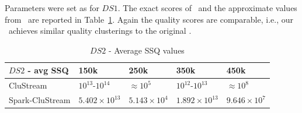 Parameters were set as for $DS1$.
The exact scores of \our~and the approximate values from \clustream~are reported %
in Table~\ref{tab:DS2quality}. Again the quality scores are comparable, i.e., our \our~achieves similar quality clusterings to the original \clustream.

\begin{table}[t]
\centering
\begin{tabular}{|l|l|l|l|l|}\hline
\textbf{$DS2$ - avg SSQ} & \textbf{150k} & \textbf{250k} & \textbf{350k} & \textbf{450k}\\\hline
CluStream & $10^{13}$-$10^{14}$ & $\approx 10^{5}$ & $10^{12}$-$10^{13}$ & $\approx 10^{8}$\\\hline
Spark-CluStream & $5.402\times10^{13}$ & $5.143\times10^{4}$ & $1.892\times10^{13}$ & $9.646\times10^7$\\\hline
  \end{tabular}
  \caption{$DS2$ - Average SSQ values}
  \label{tab:DS2quality}
\end{table}

